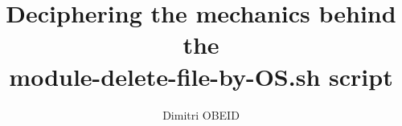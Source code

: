 \documentclass[a4paper,10pt]{article}
\title{\color{sec1}Deciphering the mechanics behind the \\ \textbf{\color{sec2}module-delete-file-by-OS.sh} script}\color{text}
\author{Dimitri OBEID}
\begin{document}
    \maketitle
    \newpage

    \hypertarget{contents}{}
    \tableofcontents
    \newpage

    \color{sec1}
    \section{}\color{text}




\end{document}
